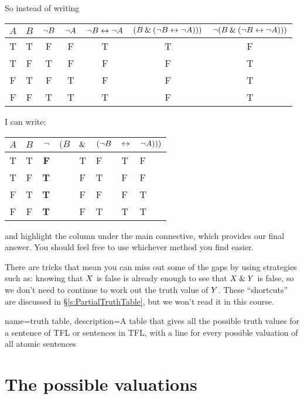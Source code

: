 So instead of writing
\begin{center}
\begin{tabular}{cc|cccc|c}
$A$&$B$&$\neg B$&$\neg A$&$\neg B\leftrightarrow \neg A$&$(B\mathbin{\&}(\neg B\leftrightarrow \neg A)))$&$\neg (B\mathbin{\&}(\neg B\leftrightarrow \neg A)))$\\\hline
T&T&F&F&T&T&F\\
T&F&T&F&F&F&T\\
F&T&F&T&F&F&T\\
F&F&T&T&T&F&T
\end{tabular}
\end{center}
I can write:\begin{center}
\begin{tabular}{cc|deeeef}
$A$&$B$&\textbf{$\neg$}&$(B$&$\mathbin{\&}$&$(\neg B$&$\leftrightarrow$&$ \neg A)))$\\\hline
T&T&\textbf{F}&&T&F&T&F\\
T&F&\textbf{T}&&F&T&F&F\\
F&T&\textbf{T}&&F&F&F&T\\
F&F&\textbf{T}&&F&T&T&T
\end{tabular}
\end{center}and highlight the column under the main connective, which provides our final answer. You should feel free to use whichever method you find easier.

There are tricks that mean you can miss out some of the gaps by using strategies such as: knowing that $X$ is false is already enough to see that $X\mathbin{\&}Y$ is false, so we don't need to continue to work out the truth value of $Y$. These ``shortcuts'' are discussed in \S\ref{s:PartialTruthTable}, but we won't read it in this course. 




{
name=truth table,
description={A table that gives all the possible \glspl{truth value} for a \gls{sentence of TFL} or sentences in TFL, with a line for every possible \gls{valuation} of all atomic sentences}
}

\section{The possible valuations}


